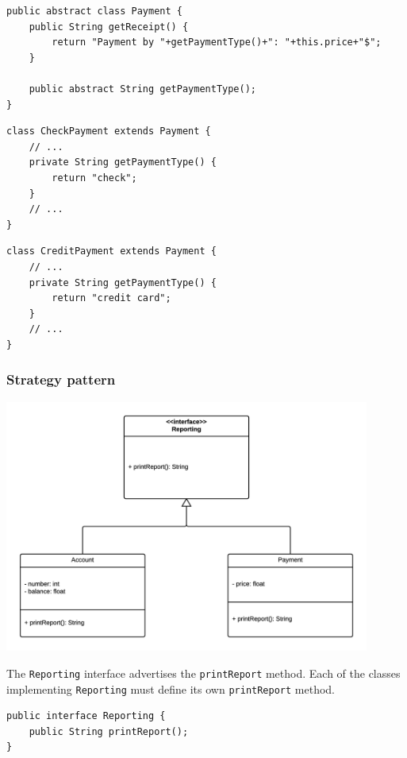 \documentclass[11pt, a4paper]{article}
\newcommand{\settextlisting}{\lstset{ basicstyle=\small\ttfamily }}
\newcommand{\setcodelisting}{\lstset{ basicstyle=\footnotesize\ttfamily }}
\begin{document}
\bigskip
\lstset{%
	basicstyle=\scriptsize\ttfamily,
}

\begin{lstlisting}
public abstract class Payment {
	public String getReceipt() {
		return "Payment by "+getPaymentType()+": "+this.price+"$";
	}
	
	public abstract String getPaymentType();
}
\end{lstlisting}


\begin{lstlisting}
class CheckPayment extends Payment {
	// ...
	private String getPaymentType() {
		return "check";
	}
	// ...
}
\end{lstlisting}


\begin{lstlisting}
class CreditPayment extends Payment {
	// ...
	private String getPaymentType() {
		return "credit card";
	}
	// ...
}
\end{lstlisting}




\subsubsection{Strategy pattern}

\centerline{\includegraphics[width=0.9\textwidth]{StrategyPattern.png}}

\medskip
\settextlisting
The \lstinline|Reporting| interface advertises the \lstinline|printReport| method.
Each of the classes implementing \lstinline|Reporting| must define its own \lstinline|printReport| method.

\bigskip
\lstset{ basicstyle=\scriptsize\ttfamily }
\begin{lstlisting}
public interface Reporting {
	public String printReport();
}
\end{lstlisting}
\end{document}
